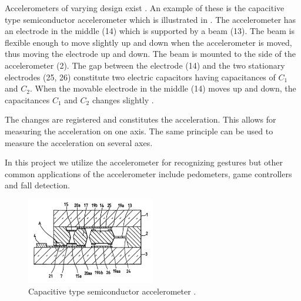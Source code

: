 Accelerometers of varying design exist \cite[pp. 392-411]{Fraden:2112745}. An example of these is the capacitive type semiconductor accelerometer which is illustrated in . The accelerometer has an electrode in the middle (14) which is supported by a beam (13). The beam is flexible enough to move slightly up and down when the accelerometer is moved, thus moving the electrode up and down. The beam is mounted to the side of the accelerometer (2). The gap between the electrode (14) and the two stationary electrodes (25, 26) constitute two electric capacitors having capacitances of $C_1$ and $C_2$.
When the movable electrode in the middle (14) moves up and down, the capacitances $C_1$ and $C_2$ changes slightly \cite{kloeck1993capacitive}.

The changes are registered and constitutes the acceleration. This allows for measuring the acceleration on one axis. The same principle can be used to measure the acceleration on several axes.

In this project we utilize the accelerometer for recognizing gestures but other common applications of the accelerometer include pedometers, game controllers and fall detection.

\begin{figure}
\centering
\includegraphics[width=0.5\textwidth]{images/accelerometer}
\caption{Capacitive type semiconductor accelerometer \cite{kloeck1993capacitive}.}
\label{fig:accelerometer}
\end{figure}

